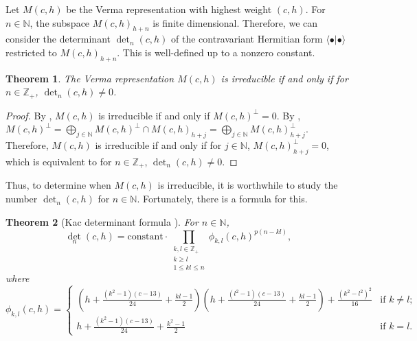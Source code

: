 \documentclass[a4paper, 12pt, reqno]{amsart}
\newtheorem{theorem}{Theorem}[section]
\theoremstyle{remark}
\begin{document}
Let $M(c, h)$ be the Verma representation with highest weight $(c, h)$.
For $n \in \mathbb{N}$, the subspace $M(c, h)_{h + n}$ is finite dimensional.
Therefore, we can consider the determinant $\det_n(c, h)$ of the contravariant Hermitian form $\langle\bullet| \bullet\rangle$ restricted to $M(c, h)_{h + n}$.
This is well-defined up to a nonzero constant.

\begin{theorem}
  \label{thr:32}
  The Verma representation $M(c, h)$ is irreducible if and only if for $n \in \mathbb{Z}_+$, $\det_n(c, h) \neq 0$.
\end{theorem}

\begin{proof}
  By , $M(c, h)$ is irreducible if and only if $M(c, h)^{\perp} = 0$.
  By , $M(c, h)^{\perp} = \bigoplus_{j \in \mathbb{N}}M(c, h)^{\perp} \cap M(c, h)_{h + j} = \bigoplus_{j \in \mathbb{N}}M(c, h)_{h + j}^{\perp}$.
  Therefore, $M(c, h)$ is irreducible if and only if for $j \in \mathbb{N}$, $M(c, h)_{h + j}^{\perp} = 0$, which is equivalent to for $n \in \mathbb{Z}_+$, $\det_n(c, h) \neq 0$.
\end{proof}

Thus, to determine when $M(c, h)$ is irreducible, it is worthwhile to study the number $\det_n(c, h)$ for $n \in \mathbb{N}$.
Fortunately, there is a formula for this.

\begin{theorem}[Kac determinant formula {\cite[Theorem 4.2]{iohara_representation_2011}}]
  \label{thr:33}
  For $n \in \mathbb{N}$,
  \begin{equation*}
    \textstyle\det_n(c, h) = \displaystyle\text{constant}\cdot\prod_{\substack{k, l \in \mathbb{Z}_+ \\ k \ge l \\ 1 \le kl \le n}}\phi_{k, l}(c, h)^{p(n - kl)},
  \end{equation*}
  where
  \begin{equation*}
    \phi_{k, l}(c, h) =
    \begin{cases}
      (h + \frac{(k^2 - 1)(c - 13)}{24} + \frac{kl - 1}{2})(h + \frac{(l^2 - 1)(c - 13)}{24} + \frac{kl - 1}{2}) + \frac{(k^2 - l^2)^2}{16} &\text{if $k \neq l$};\\
      h + \frac{(k^2 - 1)(c - 13)}{24} + \frac{k^2 - 1}{2} &\text{if $k = l$}.
    \end{cases}
  \end{equation*}
\end{theorem}
\end{document}
